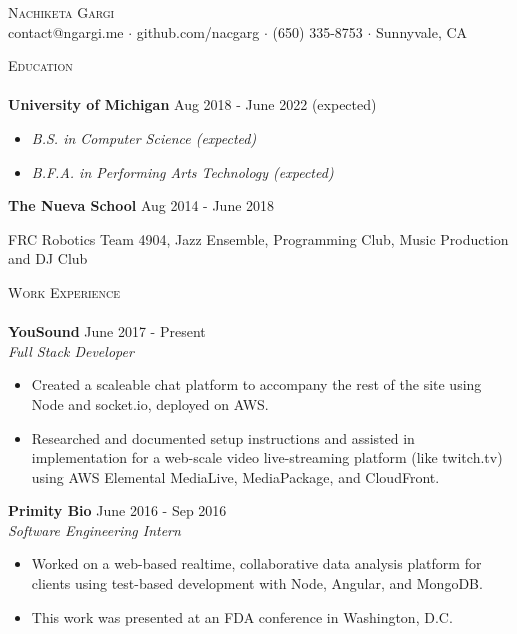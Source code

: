 \documentclass[a4paper]{article}
\newcommand{\lineunder} {
    \vspace*{-8pt} \\
    \hspace*{-18pt} \hrulefill \\
}
\newcommand{\header} [1] {
    {\hspace*{-18pt}\vspace*{6pt} \textsc{#1}}
    \vspace*{-6pt} \lineunder
}
\begin{document}
\vspace*{-40pt}
    

\vspace*{-30pt}
\begin{center}
	{\Huge \scshape {Nachiketa Gargi}}\\
	contact@ngargi.me $\cdot$ github.com/nacgarg $\cdot$ (650) 335-8753 $\cdot$ Sunnyvale, CA \\
\end{center}
\header{Education}

\noindent
\textbf{University of Michigan} \hfill Aug 2018 - June 2022 (expected)
\vspace{-2mm}
\begin{itemize}
    \setlength{\itemindent}{-3mm}
    \item[] \textit{B.S. in Computer Science (expected)}\vspace{-3mm}
    \item[] \textit{B.F.A. in Performing Arts Technology (expected)}
\end{itemize}
\noindent
\textbf{The Nueva School} \hfill Aug 2014 - June 2018\\
\vspace{-4mm}

FRC Robotics Team 4904, Jazz Ensemble, Programming Club, Music Production and DJ Club\\


\noindent
\header{Work Experience}


\noindent
\textbf{YouSound} \hfill June 2017 - Present\\
\textit{Full Stack Developer} \\
\vspace{-4mm}
\begin{itemize} \itemsep 0.1pt
	\item Created a scaleable chat platform to accompany the rest of the site using Node and socket.io, deployed on AWS.
	\item Researched and documented setup instructions and assisted in implementation for a web-scale video live-streaming platform (like twitch.tv) using AWS Elemental MediaLive, MediaPackage, and CloudFront.
\end{itemize}

\noindent
\textbf{Primity Bio} \hfill June 2016 - Sep 2016\\
\textit{Software Engineering Intern} \\
\vspace{-4mm}
\begin{itemize} \itemsep 0.1pt
	\item Worked on a web-based realtime, collaborative data analysis platform for clients using test-based development with Node, Angular, and MongoDB.
	\item This work was presented at an FDA conference in Washington, D.C.
\end{itemize}
\end{document}
